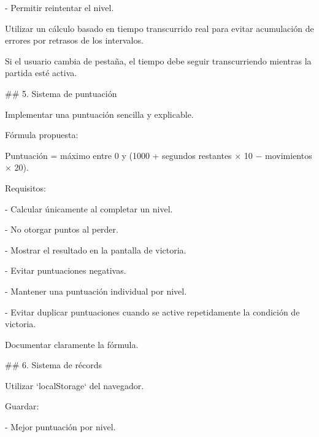 \noindent - Permitir reintentar el nivel.\par
\par\smallskip
\noindent Utilizar un cálculo basado en tiempo transcurrido real para evitar acumulación de errores por retrasos de los intervalos.\par
\par\smallskip
\noindent Si el usuario cambia de pestaña, el tiempo debe seguir transcurriendo mientras la partida esté activa.\par
\par\smallskip
\noindent \#\# 5. Sistema de puntuación\par
\par\smallskip
\noindent Implementar una puntuación sencilla y explicable.\par
\par\smallskip
\noindent Fórmula propuesta:\par
\par\smallskip
\noindent Puntuación = máximo entre 0 y (1000 + segundos restantes × 10 − movimientos × 20).\par
\par\smallskip
\noindent Requisitos:\par
\par\smallskip
\noindent - Calcular únicamente al completar un nivel.\par
\noindent - No otorgar puntos al perder.\par
\noindent - Mostrar el resultado en la pantalla de victoria.\par
\noindent - Evitar puntuaciones negativas.\par
\noindent - Mantener una puntuación individual por nivel.\par
\noindent - Evitar duplicar puntuaciones cuando se active repetidamente la condición de victoria.\par
\par\smallskip
\noindent Documentar claramente la fórmula.\par
\par\smallskip
\noindent \#\# 6. Sistema de récords\par
\par\smallskip
\noindent Utilizar `localStorage` del navegador.\par
\par\smallskip
\noindent Guardar:\par
\par\smallskip
\noindent - Mejor puntuación por nivel.\par
